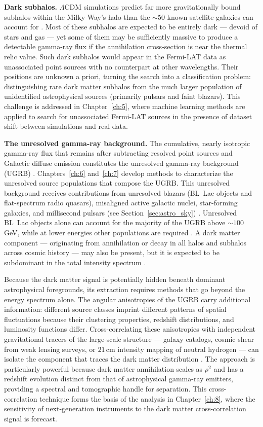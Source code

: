 \textbf{Dark subhalos.} $\Lambda$CDM simulations predict far more gravitationally bound subhalos within the Milky Way's halo than the $\sim 50$ known satellite galaxies can account for \cite{Springel:2008cc,Bullock:2017xww}.
Most of these subhalos are expected to be entirely dark --- devoid of stars and gas --- yet some of them may be sufficiently massive to produce a detectable gamma-ray flux if the annihilation cross-section is near the thermal relic value.
Such dark subhalos would appear in the Fermi-LAT data as unassociated point sources with no counterpart at other wavelengths.
Their positions are unknown a priori, turning the search into a classification problem: distinguishing rare dark matter subhalos from the much larger population of unidentified astrophysical sources (primarily pulsars and faint blazars).
This challenge is addressed in Chapter~\ref{ch:5}, where machine learning methods are applied to search for unassociated Fermi-LAT sources in the presence of dataset shift between simulations and real data.

\textbf{The unresolved gamma-ray background.}
The cumulative, nearly isotropic gamma-ray flux that remains after subtracting resolved point sources and Galactic diffuse emission constitutes the unresolved gamma-ray background (UGRB) \cite{DGRB-review}.
Chapters~\ref{ch:6} and~\ref{ch:7} develop methods to characterize the unresolved source populations that compose the UGRB.
This unresolved background receives contributions from unresolved blazars (BL~Lac objects and flat-spectrum radio quasars), misaligned active galactic nuclei, star-forming galaxies, and millisecond pulsars (see Section~\ref{sec:astro_sky}) \cite{DGRB-review}.
Unresolved BL~Lac objects alone can account for the majority of the UGRB above $\sim 100$ GeV, while at lower energies other populations are required \cite{DGRB-review}.
A dark matter component --- originating from annihilation or decay in all halos and subhalos across cosmic history --- may also be present, but it is expected to be subdominant in the total intensity spectrum \cite{DGRB-review}.

Because the dark matter signal is potentially hidden beneath dominant astrophysical foregrounds, its extraction requires methods that go beyond the energy spectrum alone.
The angular anisotropies of the UGRB carry additional information: different source classes imprint different patterns of spatial fluctuations because their clustering properties, redshift distributions, and luminosity functions differ.
Cross-correlating these anisotropies with independent gravitational tracers of the large-scale structure --- galaxy catalogs, cosmic shear from weak lensing surveys, or $21\,$cm intensity mapping of neutral hydrogen --- can isolate the component that traces the dark matter distribution \cite{DGRB-review,Pinetti:2021jjs}.
The approach is particularly powerful because dark matter annihilation scales as $\rho^2$ and has a redshift evolution distinct from that of astrophysical gamma-ray emitters, providing a spectral and tomographic handle for separation.
This cross-correlation technique forms the basis of the analysis in Chapter~\ref{ch:8}, where the sensitivity of next-generation instruments to the dark matter cross-correlation signal is forecast.

